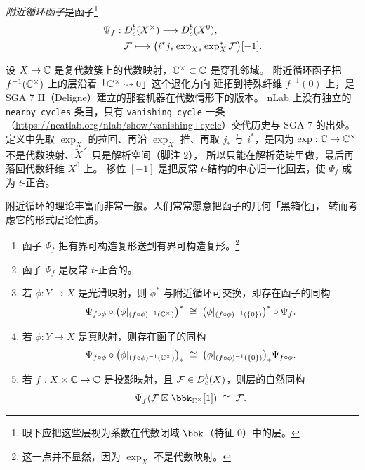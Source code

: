 \begin{definition}\label{def:nearby}
\emph{附近循环函子}是函子\footnote{眼下应把这些层视为系数在代数闭域 $\bbk$（特征 $0$）中的层。}
\begin{align*}
\Psi_f:\;&D^b_c(X^{\times})\longrightarrow D^b_c(X^{0}),\\
&\mathcal{F}\longmapsto \bigl(i^*j_*\exp_{X*}\exp_X^*\mathcal{F}\bigr)[-1].
\end{align*}
\end{definition}

\begin{yizhu}
设 $X\to\mathbb{C}$ 是复代数簇上的代数映射，$\mathbb{C}^{\times}\subset\mathbb{C}$ 是穿孔邻域。
附近循环函子把 $f^{-1}(\mathbb{C}^{\times})$ 上的层沿着「$\mathbb{C}^{\times}\rightsquigarrow 0$」这个退化方向
延拓到特殊纤维 $f^{-1}(0)$ 上，是 SGA 7 II（Deligne）建立的那套机器在代数情形下的版本。
nLab 上没有独立的 \texttt{nearby cycles} 条目，只有 \texttt{vanishing cycle} 一条
（\url{https://ncatlab.org/nlab/show/vanishing+cycle}）交代历史与 SGA 7 的出处。
定义中先取 $\exp_X$ 的拉回、再沿 $\exp_X$ 推、再取 $j_*$ 与 $i^*$，是因为
$\exp:\mathbb{C}\to\mathbb{C}^{\times}$ 不是代数映射、$\tilde X^{\times}$ 只是解析空间（脚注 2），
所以只能在解析范畴里做，最后再落回代数纤维 $X^0$ 上。
移位 $[-1]$ 是把反常 $t$-结构的中心归一化回去，使 $\Psi_f$ 成为 $t$-正合。
\end{yizhu}

附近循环的理论丰富而非常一般。人们常常愿意把函子的几何「黑箱化」，
转而考虑它的形式层论性质。

\begin{proposition}\label{prop:properties}
\begin{enumerate}[label=(\arabic*),leftmargin=2.2em,itemsep=1pt]
\item 函子 $\Psi_f$ 把有界可构造复形送到有界可构造复形。\footnote{这一点并不显然，因为 $\exp_X$ 不是代数映射。}
\item 函子 $\Psi_f$ 是反常 $t$-正合的。
\item 若 $\phi:Y\to X$ 是光滑映射，则 $\phi^*$ 与附近循环可交换，即存在函子的同构
      \[
      \Psi_{f\circ\phi}\circ\bigl(\phi|_{(f\circ\phi)^{-1}(\mathbb{C}^{\times})}\bigr)^*
      \;\cong\;\bigl(\phi|_{(f\circ\phi)^{-1}(\{0\})}\bigr)^*\circ\Psi_f .
      \]
\item 若 $\phi:Y\to X$ 是真映射，则存在函子的同构
      \[
      \Psi_{f\circ\phi}\circ\bigl(\phi|_{(f\circ\phi)^{-1}(\mathbb{C}^{\times})}\bigr)_*
      \;\cong\;\bigl(\phi|_{(f\circ\phi)^{-1}(\{0\})}\bigr)_*\Psi_{f\circ\phi}.
      \]
\item 若 $f:X\times\mathbb{C}\to\mathbb{C}$ 是投影映射，且 $\mathcal{F}\in D^b_c(X)$，则层的自然同构
      \[
      \Psi_f(\cF\boxtimes\bbk_{\bbC^{\times}}[1])\;\cong\;\cF .
      \]
\end{enumerate}
\end{proposition}

